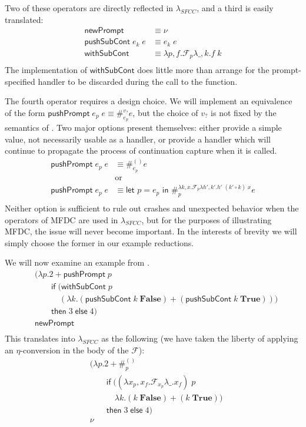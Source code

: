 \documentclass[11pt]{article}
\newcommand{\letin}[2]{\textsf{let }#1\textsf{ in }#2}
\newcommand\F{\mathcal{F}}
\begin{document}
Two of these operators are directly reflected in $\lambda_{SFCC}$, and a third is easily translated:
\begin{align*}
\mathsf{newPrompt} &\equiv \nu \\
\mathsf{pushSubCont}\;e_k\;e &\equiv e_k\;e \\
\mathsf{withSubCont} &\equiv
    \lambda p,f. \F_{p}\lambda \_,k. f\;k \\
\end{align*}
The implementation of $\mathsf{withSubCont}$ does little more than arrange for the prompt-specified handler to be discarded during the call to the function.

The fourth operator requires a design choice.
We will implement an equivalence of the form $\mathsf{pushPrompt}\;e_p\;e \equiv \#_{e_p}^{v_?}e$, but the choice of $v_?$ is not fixed by the semantics of \cite{MFDC}.
Two major options present themselves:
either provide a simple value, not necessarily usable as a handler,
or provide a handler which will continue to propagate the process of continuation capture when it is called.
\begin{align*}
\mathsf{pushPrompt}\;e_p\;e &\equiv \#_{e_p}^{()}e \\
&\textrm{or} \\
\mathsf{pushPrompt}\;e_p\;e &\equiv
    \letin{p=e_p}\#_{p}^{\lambda k,x.\F_{p}\lambda h',k'.h'\;(k' \circ k)\;x}e \\
\end{align*}
Neither option is sufficient to rule out crashes and unexpected behavior when the operators of MFDC are used in $\lambda_{SFCC}$, but for the purposes of illustrating MFDC, the issue will never become important.
In the interests of brevity we will simply choose the former in our example reductions.

We will now examine an example from \cite{MFDC}.
\begin{align*}
&(\lambda p. 2 + \mathsf{pushPrompt}\;p \\
&\qquad \mathsf{if}\;(\mathsf{withSubCont}\;p \\
&\qquad\quad (\lambda k. (\mathsf{pushSubCont}\;k\;\mathbf{False}) +
            (\mathsf{pushSubCont}\;k\;\mathbf{True}))) \\
&\qquad \mathsf{then}\;3\;\mathsf{else}\;4) \\
&\mathsf{newPrompt} \\
\end{align*}
This translates into $\lambda_{SFCC}$ as the following (we have taken the liberty of applying an $\eta$-conversion in the body of the $\F$):
\begin{align*}
&(\lambda p. 2 + \#_p^{()} \\
&\qquad \mathsf{if}\;((\lambda x_p,x_f. \F_{x_p}\lambda \_.x_f)\;p \\
&\qquad\quad \lambda k. (k\;\mathbf{False}) +
            (k\;\mathbf{True})) \\
&\qquad \mathsf{then}\;3\;\mathsf{else}\;4) \\
&\nu \\
\end{align*}
\end{document}
